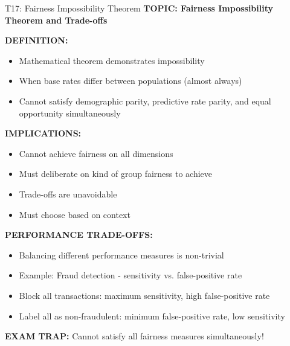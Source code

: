 \documentclass[8pt]{beamer}
\begin{document}
	\begin{frame}{T17: Fairness Impossibility Theorem}
		\fontsize{6.5}{7.5}\selectfont
		\textbf{TOPIC: Fairness Impossibility Theorem and Trade-offs}
		
		\vspace{0.1cm}
		\textbf{DEFINITION:}
		\begin{itemize}
			\item Mathematical theorem demonstrates impossibility
			\item When base rates differ between populations (almost always)
			\item Cannot satisfy demographic parity, predictive rate parity, and equal opportunity simultaneously
		\end{itemize}
		
		\vspace{0.1cm}
		\textbf{IMPLICATIONS:}
		\begin{itemize}
			\item Cannot achieve fairness on all dimensions
			\item Must deliberate on kind of group fairness to achieve
			\item Trade-offs are unavoidable
			\item Must choose based on context
		\end{itemize}
		
		\vspace{0.1cm}
		\textbf{PERFORMANCE TRADE-OFFS:}
		\begin{itemize}
			\item Balancing different performance measures is non-trivial
			\item Example: Fraud detection - sensitivity vs. false-positive rate
			\item Block all transactions: maximum sensitivity, high false-positive rate
			\item Label all as non-fraudulent: minimum false-positive rate, low sensitivity
		\end{itemize}
		
		\textcolor{myred}{\textbf{EXAM TRAP:}} Cannot satisfy \textcolor{myblue}{all fairness measures} simultaneously!
	\end{frame}
	
\end{document}
